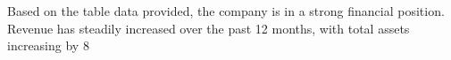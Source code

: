 

Based on the table data provided, the company is in a strong financial position. Revenue has steadily increased over the past 12 months, with total assets increasing by 8%